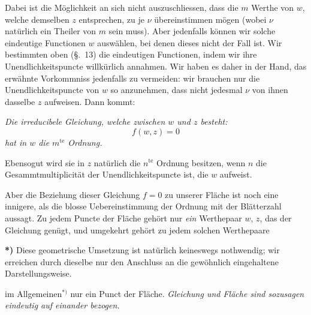\documentclass{article}
\begin{document}
Dabei ist die Möglichkeit an sich nicht auszuschliessen, dass die $m$ Werthe von $w$, welche demselben $z$ entsprechen, zu je $\nu$ übereinstimmen mögen (wobei $\nu$ natürlich ein Theiler von $m$ sein muss). Aber jedenfalls können wir solche eindeutige Functionen $w$ auswählen, bei denen dieses nicht der Fall ist. Wir bestimmten oben (§.~13) die eindeutigen Functionen, indem wir ihre Unendlichkeitspuncte willkürlich annahmen. Wir haben es daher in der Hand, das erwähnte Vorkommniss jedenfalls zu vermeiden: wir brauchen nur die Unendlichkeitspuncte von $w$ so anzunehmen, dass nicht jedesmal $\nu$ von ihnen dasselbe $z$ aufweisen. Dann kommt:

\emph{Die irreducibele Gleichung, welche zwischen $w$ und $z$ besteht:}
\[ f(w, z) = 0 \]
\emph{hat in $w$ die $m^{\text{te}}$ Ordnung.}

Ebensogut wird sie in $z$ natürlich die $n^{\text{te}}$ Ordnung besitzen, wenn $n$ die Gesammtmultiplicität der Unendlichkeitspuncte ist, die $w$ aufweist.

Aber die Beziehung dieser Gleichung $f = 0$ zu unserer Fläche ist noch eine innigere, als die blosse Uebereinstimmung der Ordnung mit der Blätterzahl aussagt. Zu jedem Puncte der Fläche gehört nur \emph{ein} Werthepaar $w$, $z$, das der Gleichung genügt, und umgekehrt gehört zu jedem solchen Werthepaare

\textbf{*)} Diese geometrische Umsetzung ist natürlich keineswegs nothwendig; wir erreichen durch dieselbe nur den Anschluss an die gewöhnlich eingehaltene Darstellungsweise.

im Allgemeinen${}^{*)}$ nur ein Punct der Fläche. \emph{Gleichung und Fläche sind sozusagen eindeutig auf einander bezogen.}
\end{document}
